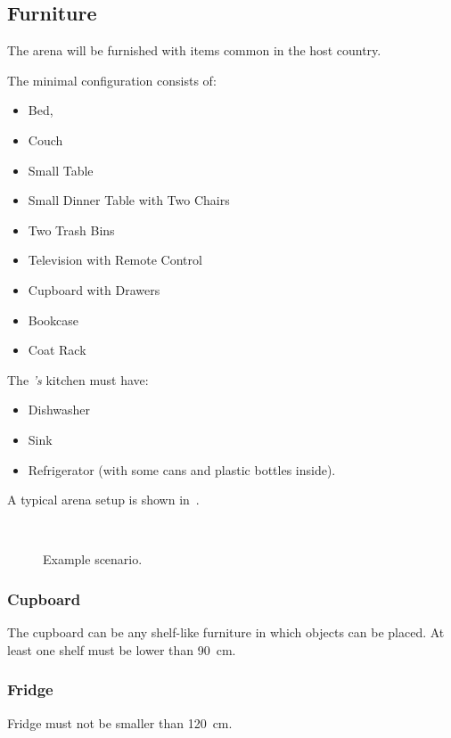 \subsection{Furniture}
\label{sec:rules:scenario:furniture}
The arena will be furnished with items common in the host country.

The minimal configuration consists of:
\begin{itemize}
	\item Bed,
	\item Couch
	\item Small Table
	\item Small Dinner Table with Two Chairs
	\item Two Trash Bins
	\item Television with Remote Control
	\item Cupboard with Drawers
	\item Bookcase
	\item Coat Rack
\end{itemize}

The \Arena\textit{'s} kitchen must have:
\begin{itemize}
	\item Dishwasher
	\item Sink
	\item Refrigerator (with some cans and plastic bottles inside).
\end{itemize}

A typical arena setup is shown in~.

\begin{figure}[H]
	\centering
	 ~
	\caption{Example \RoboCup\AtHome{} scenario.}
	\label{fig:arena}
\end{figure}

\subsubsection{Cupboard}
The cupboard can be any shelf-like furniture in which objects can be placed. At least one shelf must be lower than \SI{90}{\cm}.

\subsubsection{Fridge}
Fridge must not be smaller than \SI{120}{\cm}.

